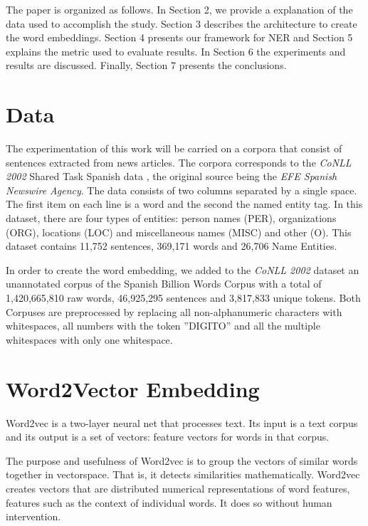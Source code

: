 \documentclass[]{article}
\begin{document}
	The paper is organized as follows. In Section 2, we provide a explanation of the data used to accomplish the study. Section 3 describes the architecture to create the word embeddings. Section 4 presents our framework for NER and Section 5 explains the metric used to evaluate results. In Section 6 the experiments and results are discussed.  Finally, Section 7 presents the conclusions.
	
	\section{Data}
	The experimentation of this work will be carried on a corpora that consist of sentences extracted from news articles. The corpora corresponds to the \emph{CoNLL 2002} Shared Task Spanish data \cite{dataset}, the original source being the \emph{EFE Spanish Newswire Agency}.  The data consists of two columns separated by a single space. The first item on each line is a word and the second the named entity tag. In this dataset, there are four types of entities: person names (PER), organizations (ORG), locations (LOC) and miscellaneous names (MISC) and other (O). This dataset contains 11,752 sentences, 369,171 words and 26,706 Name Entities.  
	
	In order to create the word embedding, we added to the \emph{CoNLL 2002} dataset an unannotated corpus of the Spanish Billion Words Corpus  \cite{billion} with a total of 1,420,665,810 raw words,  46,925,295 sentences and 3,817,833 unique tokens. Both Corpuses are preprocessed by replacing all non-alphanumeric characters with whitespaces, all numbers with the token ''DIGITO'' and all the multiple whitespaces with only one whitespace.
	
	
	
	\section{Word2Vector Embedding}
	
	Word2vec is a two-layer neural net that processes text. Its input is a text corpus and its output is a set of vectors: feature vectors for words in that corpus. 
	
	The purpose and usefulness of Word2vec is to group the vectors of similar words together in vectorspace. That is, it detects similarities mathematically. Word2vec creates vectors that are distributed numerical representations of word features, features such as the context of individual words. It does so without human intervention. 
	
\end{document}
